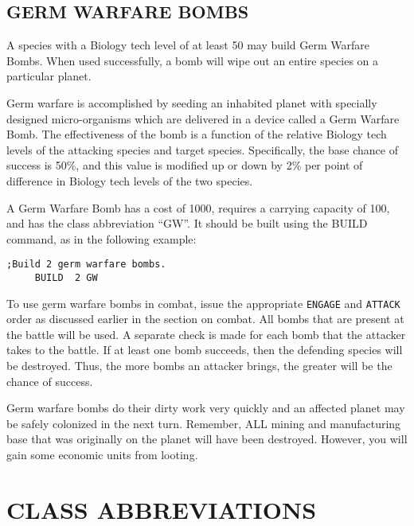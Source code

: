 \documentclass[10pt,titlepage]{article}
\begin{document}
\subsection{GERM WARFARE BOMBS}

A species with a Biology tech level of at least 50 may build Germ Warfare
Bombs.  When used successfully, a bomb will wipe out an entire species on a
particular planet.

Germ warfare is accomplished by seeding an inhabited planet with specially
designed micro-organisms which are delivered in a device called a Germ Warfare
Bomb.  The effectiveness of the bomb is a function of the relative Biology tech
levels of the attacking species and target species.  Specifically, the base
chance of success is 50\%, and this value is modified up or down by 2\% per point
of difference in Biology tech levels of the two species.

A Germ Warfare Bomb has a cost of 1000, requires a carrying capacity of 100,
and has the class abbreviation ``GW''.  It should be built using the BUILD
command, as in the following example:

\begin{verbatim}
;Build 2 germ warfare bombs.
     BUILD	2 GW\end{verbatim} 

To use germ warfare bombs in combat, issue the appropriate \texttt{ENGAGE} and \texttt{ATTACK}
order as discussed earlier in the section on combat.  All bombs that are
present at the battle will be used.  A separate check is made for each bomb
that the attacker takes to the battle.  If at least one bomb succeeds, then the
defending species will be destroyed.  Thus, the more bombs an attacker brings,
the greater will be the chance of success.

Germ warfare bombs do their dirty work very quickly and an affected planet may
be safely colonized in the next turn.  Remember, ALL mining and manufacturing
base that was originally on the planet will have been destroyed.  However, you
will gain some economic units from looting.


\section{CLASS ABBREVIATIONS}
\end{document}
